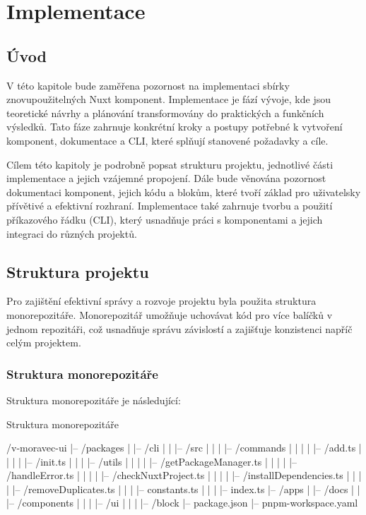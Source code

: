 
\chapter{Implementace}

\section{Úvod}
V této kapitole bude zaměřena pozornost na implementaci sbírky znovupoužitelných Nuxt komponent. Implementace je fází vývoje, kde jsou teoretické návrhy a plánování transformovány do praktických a funkčních výsledků. Tato fáze zahrnuje konkrétní kroky a postupy potřebné k vytvoření komponent, dokumentace a CLI, které splňují stanovené požadavky a cíle.

Cílem této kapitoly je podrobně popsat strukturu projektu, jednotlivé části implementace a jejich vzájemné propojení. Dále bude věnována pozornost dokumentaci komponent, jejich kódu a blokům, které tvoří základ pro uživatelsky přívětivé a efektivní rozhraní. Implementace také zahrnuje tvorbu a použití příkazového řádku (CLI), který usnadňuje práci s komponentami a jejich integraci do různých projektů.

\section{Struktura projektu}
Pro zajištění efektivní správy a rozvoje projektu byla použita struktura monorepozitáře. Monorepozitář umožňuje uchovávat kód pro více balíčků v jednom repozitáři, což usnadňuje správu závislostí a zajišťuje konzistenci napříč celým projektem.

\clearpage

\subsection{Struktura monorepozitáře}
Struktura monorepozitáře je následující:

\begin{listing}[H]
\caption{Struktura monorepozitáře}
\label{lst:monorepo-structure}
\begin{code}[bash]
/v-moravec-ui
|-- /packages
|   |-- /cli
|   |   |-- /src
|   |   |   |-- /commands
|   |   |   |   |-- /add.ts
|   |   |   |   |-- /init.ts
|   |   |   |-- /utils
|   |   |   |   |-- /getPackageManager.ts
|   |   |   |   |-- /handleError.ts
|   |   |   |   |-- /checkNuxtProject.ts
|   |   |   |   |-- /installDependencies.ts
|   |   |   |   |-- /removeDuplicates.ts
|   |   |   |-- constants.ts
|   |   |   |-- index.ts
|-- /apps
|   |-- /docs
|   |   |-- /components
|   |   |   |-- /ui
|   |   |   |-- /block
|-- package.json
|-- pnpm-workspace.yaml
\end{code}
\end{listing}

